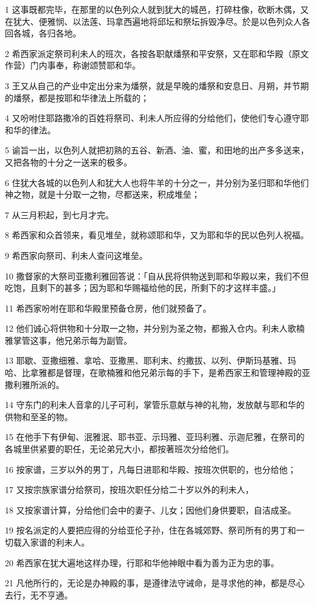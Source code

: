 \par 1 这事既都完毕，在那里的以色列众人就到犹大的城邑，打碎柱像，砍断木偶，又在犹大、便雅悯、以法莲、玛拿西遍地将邱坛和祭坛拆毁净尽。於是以色列众人各回各城，各归各地。
\par 2 希西家派定祭司利未人的班次，各按各职献燔祭和平安祭，又在耶和华殿（原文作营）门内事奉，称谢颂赞耶和华。
\par 3 王又从自己的产业中定出分来为燔祭，就是早晚的燔祭和安息日、月朔，并节期的燔祭，都是按耶和华律法上所载的；
\par 4 又吩咐住耶路撒冷的百姓将祭司、利未人所应得的分给他们，使他们专心遵守耶和华的律法。
\par 5 谕旨一出，以色列人就把初熟的五谷、新酒、油、蜜，和田地的出产多多送来，又把各物的十分之一送来的极多。
\par 6 住犹大各城的以色列人和犹大人也将牛羊的十分之一，并分别为圣归耶和华他们神之物，就是十分取一之物，尽都送来，积成堆垒；
\par 7 从三月积起，到七月才完。
\par 8 希西家和众首领来，看见堆垒，就称颂耶和华，又为耶和华的民以色列人祝福。
\par 9 希西家向祭司、利未人查问这堆垒。
\par 10 撒督家的大祭司亚撒利雅回答说：「自从民将供物送到耶和华殿以来，我们不但吃饱，且剩下的甚多；因为耶和华赐福给他的民，所剩下的才这样丰盛。」
\par 11 希西家吩咐在耶和华殿里预备仓房，他们就预备了。
\par 12 他们诚心将供物和十分取一之物，并分别为圣之物，都搬入仓内。利未人歌楠雅掌管这事，他兄弟示每为副管。
\par 13 耶歇、亚撒细雅、拿哈、亚撒黑、耶利末、约撒拔、以列、伊斯玛基雅、玛哈、比拿雅都是督理，在歌楠雅和他兄弟示每的手下，是希西家王和管理神殿的亚撒利雅所派的。
\par 14 守东门的利未人音拿的儿子可利，掌管乐意献与神的礼物，发放献与耶和华的供物和至圣的物。
\par 15 在他手下有伊甸、泯雅泯、耶书亚、示玛雅、亚玛利雅、示迦尼雅，在祭司的各城里供紧要的职任，无论弟兄大小，都按著班次分给他们。
\par 16 按家谱，三岁以外的男丁，凡每日进耶和华殿、按班次供职的，也分给他；
\par 17 又按宗族家谱分给祭司，按班次职任分给二十岁以外的利未人，
\par 18 又按家谱计算，分给他们会中的妻子、儿女；因他们身供要职，自洁成圣。
\par 19 按名派定的人要把应得的分给亚伦子孙，住在各城郊野、祭司所有的男丁和一切载入家谱的利未人。
\par 20 希西家在犹大遍地这样办理，行耶和华他神眼中看为善为正为忠的事。
\par 21 凡他所行的，无论是办神殿的事，是遵律法守诫命，是寻求他的神，都是尽心去行，无不亨通。

